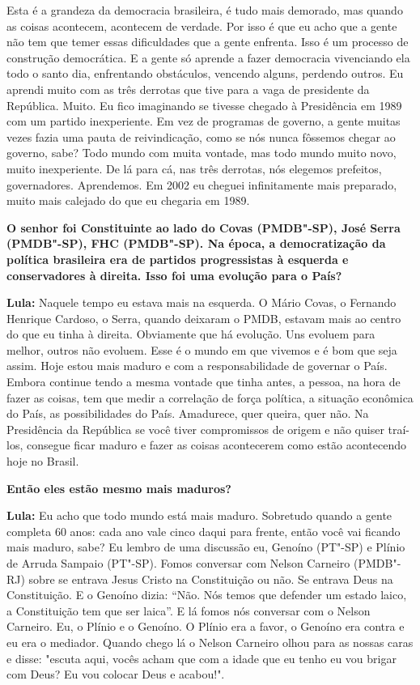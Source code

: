 Esta é a grandeza da democracia brasileira, é tudo mais demorado, mas
quando as coisas acontecem, acontecem de verdade. Por isso é que eu acho
que a gente não tem que temer essas dificuldades que a gente enfrenta.
Isso é um processo de construção democrática. E a gente só aprende a
fazer democracia vivenciando ela todo o santo dia, enfrentando
obstáculos, vencendo alguns, perdendo outros. Eu aprendi muito com as
três derrotas que tive para a vaga de presidente da República. Muito. Eu
fico imaginando se tivesse chegado à Presidência em 1989 com um partido
inexperiente. Em vez de programas de governo, a gente muitas vezes fazia
uma pauta de reivindicação, como se nós nunca fôssemos chegar ao
governo, sabe? Todo mundo com muita vontade, mas todo mundo muito novo,
muito inexperiente. De lá para cá, nas três derrotas, nós elegemos
prefeitos, governadores. Aprendemos. Em 2002 eu cheguei infinitamente
mais preparado, muito mais calejado do que eu chegaria em 1989.

\textbf{O senhor foi Constituinte ao lado do Covas (PMDB"-SP), José Serra
(PMDB"-SP), FHC (PMDB"-SP). Na época, a democratização da política
brasileira era de partidos progressistas à esquerda e conservadores à
direita. Isso foi uma evolução para o País?}

\textbf{Lula:} Naquele tempo eu estava mais na esquerda. O Mário Covas,
o Fernando Henrique Cardoso, o Serra, quando deixaram o PMDB, estavam
mais ao centro do que eu tinha à direita. Obviamente que há evolução.
Uns evoluem para melhor, outros não evoluem. Esse é o mundo em que
vivemos e é bom que seja assim. Hoje estou mais maduro e com a
responsabilidade de governar o País. Embora continue tendo a mesma
vontade que tinha antes, a pessoa, na hora de fazer as coisas, tem que
medir a correlação de força política, a situação econômica do País, as
possibilidades do País. Amadurece, quer queira, quer não. Na Presidência
da República se você tiver compromissos de origem e não quiser traí-los,
consegue ficar maduro e fazer as coisas acontecerem como estão
acontecendo hoje no Brasil.

\textbf{Então eles estão mesmo mais maduros?}

\textbf{Lula:} Eu acho que todo mundo está mais maduro. Sobretudo quando
a gente completa 60 anos: cada ano vale cinco daqui para frente, então
você vai ficando mais maduro, sabe? Eu lembro de uma discussão eu,
Genoíno (PT"-SP) e Plínio de Arruda Sampaio (PT"-SP). Fomos conversar com
Nelson Carneiro (PMDB"-RJ) sobre se entrava Jesus Cristo na Constituição
ou não. Se entrava Deus na Constituição. E o Genoíno dizia: ``Não. Nós
temos que defender um estado laico, a Constituição tem que ser laica''.
E lá fomos nós conversar com o Nelson Carneiro. Eu, o Plínio e o
Genoíno. O Plínio era a favor, o Genoíno era contra e eu era o mediador.
Quando chego lá o Nelson Carneiro olhou para as nossas caras e disse:
"escuta aqui, vocês acham que com a idade que eu tenho eu vou brigar com
Deus? Eu vou colocar Deus e acabou!".

